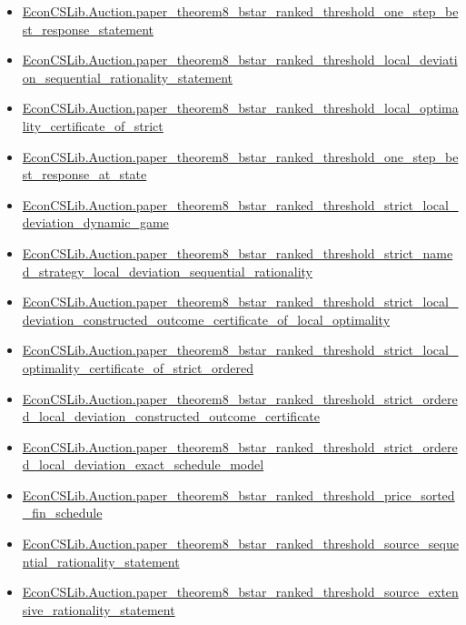 \documentclass[10pt]{article}
\begin{document}
\begin{itemize}[leftmargin=1.2em]
\begin{itemize}[leftmargin=1.2em]
\item \hyperlink{library-prerequisite-e704ac87510cda46}{EconCSLib.Auction.paper\_theorem8\_bstar\_ranked\_threshold\_one\_step\_best\_response\_statement}
\item \hyperlink{library-prerequisite-31e92f2f9ce88af3}{EconCSLib.Auction.paper\_theorem8\_bstar\_ranked\_threshold\_local\_deviation\_sequential\_rationality\_statement}
\item \hyperlink{library-prerequisite-7cab4fe0f14a00ef}{EconCSLib.Auction.paper\_theorem8\_bstar\_ranked\_threshold\_local\_optimality\_certificate\_of\_strict}
\item \hyperlink{library-prerequisite-832ed104927ad54b}{EconCSLib.Auction.paper\_theorem8\_bstar\_ranked\_threshold\_one\_step\_best\_response\_at\_state}
\item \hyperlink{library-prerequisite-c4dcc3901ee6a7d9}{EconCSLib.Auction.paper\_theorem8\_bstar\_ranked\_threshold\_strict\_local\_deviation\_dynamic\_game}
\item \hyperlink{library-prerequisite-71cd19e9ceca9628}{EconCSLib.Auction.paper\_theorem8\_bstar\_ranked\_threshold\_strict\_named\_strategy\_local\_deviation\_sequential\_rationality}
\item \hyperlink{library-prerequisite-6d4048fb43f95732}{EconCSLib.Auction.paper\_theorem8\_bstar\_ranked\_threshold\_strict\_local\_deviation\_constructed\_outcome\_certificate\_of\_local\_optimality}
\item \hyperlink{library-prerequisite-da5e0fec0d037499}{EconCSLib.Auction.paper\_theorem8\_bstar\_ranked\_threshold\_strict\_local\_optimality\_certificate\_of\_strict\_ordered}
\item \hyperlink{library-prerequisite-3ffd576413615523}{EconCSLib.Auction.paper\_theorem8\_bstar\_ranked\_threshold\_strict\_ordered\_local\_deviation\_constructed\_outcome\_certificate}
\item \hyperlink{library-prerequisite-d72570ac36d989b2}{EconCSLib.Auction.paper\_theorem8\_bstar\_ranked\_threshold\_strict\_ordered\_local\_deviation\_exact\_schedule\_model}
\item \hyperlink{library-prerequisite-099d113cc009c5d3}{EconCSLib.Auction.paper\_theorem8\_bstar\_ranked\_threshold\_price\_sorted\_fin\_schedule}
\item \hyperlink{library-prerequisite-0d248627ec154a7f}{EconCSLib.Auction.paper\_theorem8\_bstar\_ranked\_threshold\_source\_sequential\_rationality\_statement}
\item \hyperlink{library-prerequisite-3cbdcb58d9f9d60e}{EconCSLib.Auction.paper\_theorem8\_bstar\_ranked\_threshold\_source\_extensive\_rationality\_statement}

\end{itemize}
\end{itemize}
\end{document}
